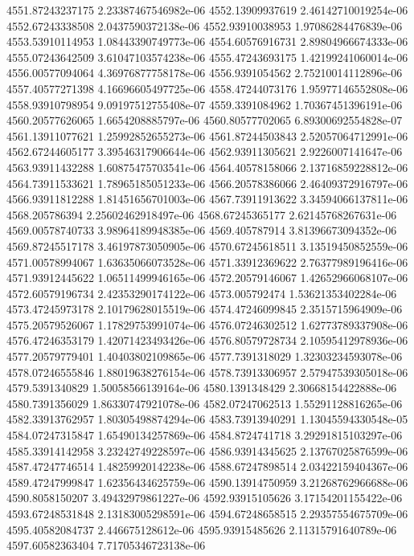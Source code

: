 {4551.87243237175 2.23387467546982e-06
4552.13909937619 2.46142710019254e-06
4552.67243338508 2.0437590372138e-06
4552.93910038953 1.97086284476839e-06
4553.53910114953 1.08443390749773e-06
4554.60576916731 2.89804966674333e-06
4555.07243642509 3.61047103574238e-06
4555.47243693175 1.42199241060014e-06
4556.00577094064 4.36976877758178e-06
4556.9391054562 2.75210014112896e-06
4557.40577271398 4.16696605497725e-06
4558.47244073176 1.95977146552808e-06
4558.93910798954 9.09197512755408e-07
4559.3391084962 1.70367451396191e-06
4560.20577626065 1.6654208885797e-06
4560.80577702065 6.89300692554828e-07
4561.13911077621 1.25992852655273e-06
4561.87244503843 2.52057064712991e-06
4562.67244605177 3.39546317906644e-06
4562.93911305621 2.9226007141647e-06
4563.93911432288 1.60875475703541e-06
4564.40578158066 2.13716859228812e-06
4564.73911533621 1.78965185051233e-06
4566.20578386066 2.46409372916797e-06
4566.93911812288 1.81451656701003e-06
4567.73911913622 3.34594066137811e-06
4568.205786394 2.25602462918497e-06
4568.67245365177 2.62145768267631e-06
4569.00578740733 3.98964189948385e-06
4569.405787914 3.81396673094352e-06
4569.87245517178 3.46197873050905e-06
4570.67245618511 3.13519450852559e-06
4571.00578994067 1.63635066073528e-06
4571.33912369622 2.76377989196416e-06
4571.93912445622 1.06511499946165e-06
4572.20579146067 1.42652966068107e-06
4572.60579196734 2.42353290174122e-06
4573.005792474 1.53621353402284e-06
4573.47245973178 2.10179628015519e-06
4574.47246099845 2.3515715964909e-06
4575.20579526067 1.17829753991074e-06
4576.07246302512 1.62773789337908e-06
4576.47246353179 1.42071423493426e-06
4576.80579728734 2.10595412978936e-06
4577.20579779401 1.40403802109865e-06
4577.7391318029 1.32303234593078e-06
4578.07246555846 1.88019638276154e-06
4578.73913306957 2.57947539305018e-06
4579.5391340829 1.50058566139164e-06
4580.1391348429 2.30668154422888e-06
4580.7391356029 1.86330747921078e-06
4582.07247062513 1.55291128816265e-06
4582.33913762957 1.80305498874294e-06
4583.73913940291 1.13045594330548e-05
4584.07247315847 1.65490134257869e-06
4584.8724741718 3.29291815103297e-06
4585.33914142958 3.23242749228597e-06
4586.93914345625 2.13767025876599e-06
4587.47247746514 1.48259920142238e-06
4588.67247898514 2.03422159404367e-06
4589.47247999847 1.62356434625759e-06
4590.13914750959 3.21268762966688e-06
4590.8058150207 3.49432979861227e-06
4592.93915105626 3.17154201155422e-06
4593.67248531848 2.13183005298591e-06
4594.67248658515 2.29357554675709e-06
4595.40582084737 2.446675128612e-06
4595.93915485626 2.11315791640789e-06
4597.60582363404 7.71705346723138e-06
}
